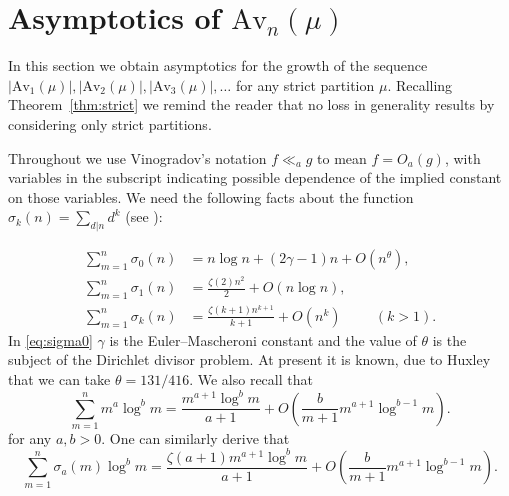 \documentclass{article}
\theoremstyle{plain}
\theoremstyle{definition}
\newcommand{\Av}{\text{Av}}
\begin{document}
 



















\section{Asymptotics of $\Av_n(\mu)$}\label{sec:growth}



In this section we obtain asymptotics for the growth of the sequence $|\Av_1(\mu)|,|\Av_2(\mu)|,|\Av_3(\mu)|,\ldots$ for any strict partition $\mu$. Recalling Theorem~\ref{thm:strict} we remind the reader that no loss in generality results by considering only strict partitions.   

Throughout we use Vinogradov's notation $f \ll_a g $ to mean $f = O_a(g)$, with variables in the subscript indicating possible dependence of the implied constant on those variables.  We need the following facts about the function $\sigma_k(n) = \sum_{d|n} d^k$ (see \cite{HardyWright}):

\begin{align}
    \sum_{m=1}^n \sigma_0(n) &= n \log n + (2\gamma -1)n + O(n^\theta) \label{eq:sigma0}, \\ 
    \sum_{m=1}^n \sigma_1(n) &= \frac{\zeta(2)n^2}{2} + O(n\log n), \label{eq:sigma1}\\
    \sum_{m=1}^n \sigma_k(n) &= \frac{\zeta(k+1)n^{k+1}}{k+1} + O(n^k) \hspace{1cm} (k>1). \label{eq:sigmak}
\end{align}
In \eqref{eq:sigma0} $\gamma$ is the Euler–Mascheroni constant and the value of $\theta$ is the subject of the Dirichlet divisor problem.    At present it is known, due to Huxley \cite{Huxley} that we can take $\theta=131/416$.  We also recall that \begin{equation}
    \sum_{m=1}^n m^a \log^b m = \frac{m^{a+1} \log^b m}{a+1} + O\left(\frac{b}{m+1} m^{a+1}\log^{b-1} m \right). \label{eq:logsum}
\end{equation}
for any $a,b>0$. One can similarly derive that \begin{equation}
    \sum_{m=1}^n \sigma_a(m) \log^b m = \frac{\zeta(a+1)m^{a+1} \log^b m}{a+1} + O\left(\frac{b}{m+1} m^{a+1}\log^{b-1}m \right). \label{eq:sigmalogsum}
\end{equation}
\end{document}
